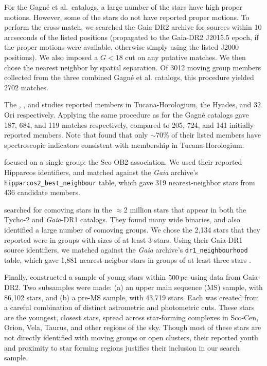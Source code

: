 \documentclass[12pt,twocolumn,tighten]{aastex62}
\begin{document}
For the Gagn\'e et al{.}~catalogs, a large number of the stars have
high proper motions.  However, some of the stars do not have reported
proper motions.  To perform the cross-match, we searched the Gaia-DR2
archive for sources within 10 arcseconds of the listed positions
(propagated to the Gaia-DR2 J2015.5 epoch, if the proper motions were
available, otherwise simply using the listed J2000 positions).  We
also imposed a $G<18$ cut on any putative matches.  We then chose the
nearest neighbor by spatial separation.  Of 3012 moving group members
collected from the three combined Gagn\'e et al{.} catalogs, this
procedure yielded 2702 matches.

The \citet{kraus_tucanahor_2014}, \citet{roser_deep_2011}, and
\citet{bell_32ori_2017} studies reported members in Tucana-Horologium,
the Hyades, and 32$\,$Ori respectively.  Applying the same procedure
as for the Gagn\'e catalogs gave 187, 684, and 119 matches
respectively, compared to 205, 724, and 141 initially reported
members.  Note that \citet{kraus_tucanahor_2014} found that only
$\sim$70\% of their listed members have spectroscopic indicators
consistent with membership in Tucana-Horologium.

\citet{rizzuto_multidimensional_2011} focused on a single group: the
Sco OB2 association. We used their reported Hipparcos identifiers, and
matched against the {\it Gaia} archive's
\texttt{hipparcos2\_best\_neighbour} table, which gave 319
nearest-neighbor stars from 436 candidate members.

\citet{oh_comoving_2017} searched for comoving stars in the $\approx$2
million stars that appear in both the Tycho-2 and {\it Gaia}-DR1
catalogs.  They found many wide binaries, and also identified a large
number of comoving groups.  We chose the 2{,}134 stars that they
reported were in groups with sizes of at least 3 stars.  Using their
Gaia-DR1 source identifiers, we matched against the {\it Gaia}
archive's \texttt{dr1\_neighbourhood} table, which gave 1{,}881
nearest-neigbor stars in groups of at least three stars
\citep{marrese_gaia_2019}.

Finally, \citet{zari_3d_2018} constructed a sample of young stars
within $500\,{\rm pc}$ using data from Gaia-DR2. Two subsamples were
made: (a) an upper main sequence (MS) sample, with 86{,}102 stars, and
(b) a pre-MS sample, with 43{,}719 stars.  Each was created from a
careful combination of distinct astrometric and photometric cuts.
These stars are the youngest, closest stars, spread across
star-forming complexes in Sco-Cen, Orion, Vela, Taurus, and other
regions of the sky.  Though most of these stars are not directly
identified with moving groups or open clusters, their reported youth
and proximity to star forming regions justifies their inclusion in our
search sample.
\end{document}
